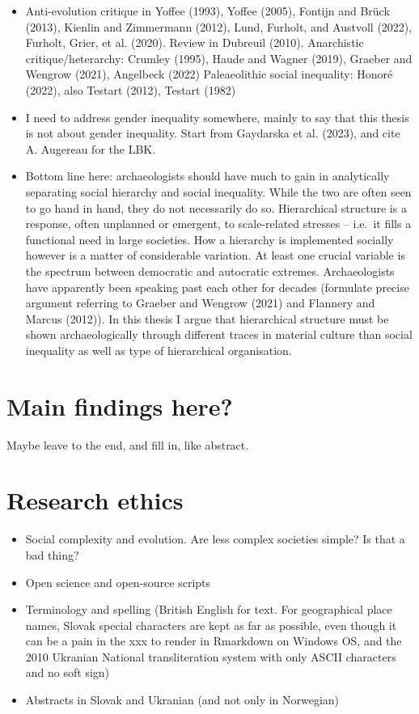 \documentclass[
  12pt,
  a4paper, twoside]{book}
\providecommand{\tightlist}{%
  \setlength{\itemsep}{0pt}\setlength{\parskip}{0pt}}
\begin{document}
\begin{itemize}
\tightlist
\item
  Anti-evolution critique in Yoffee (1993), Yoffee (2005), Fontijn and Brück (2013), Kienlin and Zimmermann (2012), Lund, Furholt, and Austvoll (2022), Furholt, Grier, et al. (2020). Review in Dubreuil (2010). Anarchistic critique/heterarchy: Crumley (1995), Haude and Wagner (2019), Graeber and Wengrow (2021), Angelbeck (2022) Paleaeolithic social inequality: Honoré (2022), also Testart (2012), Testart (1982)
\item
  I need to address gender inequality somewhere, mainly to say that this thesis is not about gender inequality. Start from Gaydarska et al. (2023), and cite A. Augereau for the LBK.
\item
  Bottom line here: archaeologists should have much to gain in analytically separating social hierarchy and social inequality. While the two are often seen to go hand in hand, they do not necessarily do so. Hierarchical structure is a response, often unplanned or emergent, to scale-related stresses -- i.e.~it fills a functional need in large societies. How a hierarchy is implemented socially however is a matter of considerable variation. At least one crucial variable is the spectrum between democratic and autocratic extremes. Archaeologists have apparently been speaking past each other for decades (formulate precise argument referring to Graeber and Wengrow (2021) and Flannery and Marcus (2012)). In this thesis I argue that hierarchical structure must be shown archaeologically through different traces in material culture than social inequality as well as type of hierarchical organisation.
\end{itemize}

\hypertarget{main-findings-here}{%
\section{Main findings here?}\label{main-findings-here}}

Maybe leave to the end, and fill in, like abstract.

\hypertarget{research-ethics}{%
\section{Research ethics}\label{research-ethics}}

\begin{itemize}
\item
  Social complexity and evolution. Are less complex societies simple? Is that a bad thing?
\item
  Open science and open-source scripts
\item
  Terminology and spelling (British English for text. For geographical place names, Slovak special characters are kept as far as possible, even though it can be a pain in the xxx to render in Rmarkdown on Windows OS, and the 2010 Ukranian National transliteration system with only ASCII characters and no soft sign)
\item
  Abstracts in Slovak and Ukranian (and not only in Norwegian)
\end{itemize}
\end{document}
